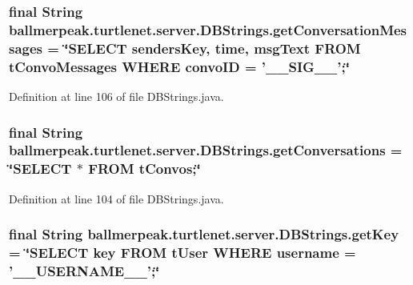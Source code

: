 \hypertarget{classballmerpeak_1_1turtlenet_1_1server_1_1DBStrings_a181d0ea3e7576342fa2c4d22fde126d8}{
\subsubsection[{get\-Conversation\-Messages}]{\setlength{\rightskip}{0pt plus 5cm}final String ballmerpeak.\-turtlenet.\-server.\-D\-B\-Strings.\-get\-Conversation\-Messages = \char`\"{}S\-E\-L\-E\-C\-T senders\-Key, time, msg\-Text F\-R\-O\-M t\-Convo\-Messages W\-H\-E\-R\-E convo\-I\-D = '\-\_\-\-\_\-\-S\-I\-G\-\_\-\-\_\-';\char`\"{}\hspace{0.3cm}{\ttfamily [static]}}}\label{classballmerpeak_1_1turtlenet_1_1server_1_1DBStrings_a181d0ea3e7576342fa2c4d22fde126d8}


Definition at line 106 of file D\-B\-Strings.\-java.

\hypertarget{classballmerpeak_1_1turtlenet_1_1server_1_1DBStrings_a329ba6510f891c7ff5a45117bb13c46f}{
\subsubsection[{get\-Conversations}]{\setlength{\rightskip}{0pt plus 5cm}final String ballmerpeak.\-turtlenet.\-server.\-D\-B\-Strings.\-get\-Conversations = \char`\"{}S\-E\-L\-E\-C\-T $\ast$ F\-R\-O\-M t\-Convos;\char`\"{}\hspace{0.3cm}{\ttfamily [static]}}}\label{classballmerpeak_1_1turtlenet_1_1server_1_1DBStrings_a329ba6510f891c7ff5a45117bb13c46f}


Definition at line 104 of file D\-B\-Strings.\-java.

\hypertarget{classballmerpeak_1_1turtlenet_1_1server_1_1DBStrings_ad9a4d662e135722a93cd5b5b37839e84}{
\subsubsection[{get\-Key}]{\setlength{\rightskip}{0pt plus 5cm}final String ballmerpeak.\-turtlenet.\-server.\-D\-B\-Strings.\-get\-Key = \char`\"{}S\-E\-L\-E\-C\-T key F\-R\-O\-M t\-User W\-H\-E\-R\-E username = '\-\_\-\-\_\-\-U\-S\-E\-R\-N\-A\-M\-E\-\_\-\-\_\-';\char`\"{}\hspace{0.3cm}{\ttfamily [static]}}}\label{classballmerpeak_1_1turtlenet_1_1server_1_1DBStrings_ad9a4d662e135722a93cd5b5b37839e84}


